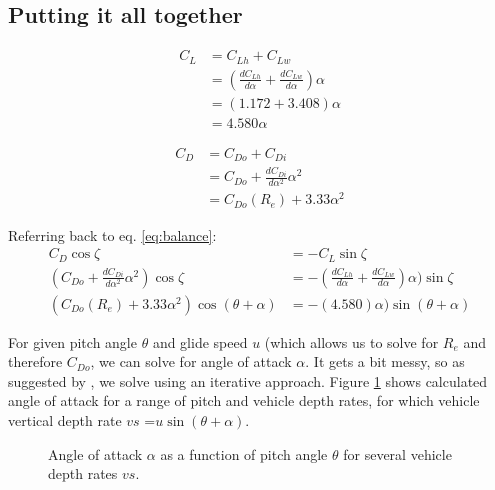 \documentclass[10pt]{article}
\begin{document}
\subsection{Putting it all together}
\begin{align}
C_L &= C_{Lh}+ C_{Lw}\\
&=( \frac{dC_{Lh}}{d\alpha}+ \frac{dC_{Lw}}{d\alpha})\alpha\\
&= (1.172 + 3.408)\alpha\\ 
&=4.580\alpha
\end{align}

\begin{align}
C_D &= C_{Do}+ C_{Di}\\
&= C_{Do}+ \frac{dC_{Di}}{d\alpha^2}\alpha^2\\
&= C_{Do}(R_e) +3.33\alpha^2
\end{align}

Referring back to  eq. \ref{eq:balance}:
\begin{align}\label{eq:aoa}
C_D \cos{\zeta}&= -C_L \sin{\zeta}\\
(C_{Do}+ \frac{dC_{Di}}{d\alpha^2}\alpha^2)\cos{\zeta}&=- ( \frac{dC_{Lh}}{d\alpha}+ \frac{dC_{Lw}}{d\alpha})\alpha)\sin{\zeta}\\
(C_{Do}(R_e)+3.33\alpha^2)\cos{(\theta+\alpha)}&=- (4.580)\alpha)\sin{(\theta+\alpha)}
\end{align}

For given pitch angle $\theta$ and glide speed $u$ (which allows us to solve for $R_e$ and therefore $C_{Do}$, we can solve for angle of attack $\alpha$.  It gets a bit messy, so as suggested by \cite{Merckelbach:2010}, we solve using an iterative approach.  Figure \ref{fig:AoA_pitchu} shows calculated angle of attack for a range of pitch and vehicle depth rates, for which vehicle vertical depth rate $vs$ =$u\sin{(\theta+\alpha)}$.

      \begin{figure}[htb]
        \caption{\label{fig:AoA_pitchu} Angle of attack $\alpha$ as a function of pitch angle $\theta$ for several vehicle depth rates $vs$.}
      \end{figure}
\end{document}
